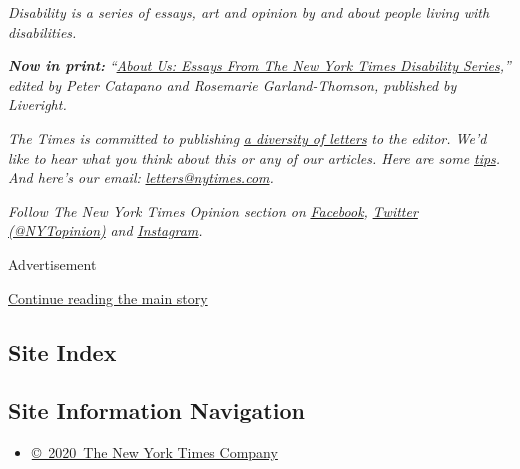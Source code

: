 \emph{Disability is a series of essays, art and opinion by and about
people living with disabilities.}

\emph{\textbf{Now in print:}}
\emph{``}\href{http://bit.ly/2WTWIVv}{\emph{About Us: Essays From The
New York Times Disability Series}}\emph{,'' edited by Peter Catapano and
Rosemarie Garland-Thomson, published by Liveright.}

\emph{The Times is committed to publishing}
\href{https://www.nytimes.com/2019/01/31/opinion/letters/letters-to-editor-new-york-times-women.html}{\emph{a
diversity of letters}} \emph{to the editor. We'd like to hear what you
think about this or any of our articles. Here are some}
\href{https://help.nytimes.com/hc/en-us/articles/115014925288-How-to-submit-a-letter-to-the-editor}{\emph{tips}}\emph{.
And here's our email:}
\href{mailto:letters@nytimes.com}{\emph{letters@nytimes.com}}\emph{.}

\emph{Follow The New York Times Opinion section on}
\href{https://www.facebook.com/nytopinion}{\emph{Facebook}}\emph{,}
\href{http://twitter.com/NYTOpinion}{\emph{Twitter (@NYTopinion)}}
\emph{and}
\href{https://www.instagram.com/nytopinion/}{\emph{Instagram}}\emph{.}

Advertisement

\protect\hyperlink{after-bottom}{Continue reading the main story}

\hypertarget{site-index}{%
\subsection{Site Index}\label{site-index}}

\hypertarget{site-information-navigation}{%
\subsection{Site Information
Navigation}\label{site-information-navigation}}

\begin{itemize}
\tightlist
\item
  \href{https://help.nytimes.com/hc/en-us/articles/115014792127-Copyright-notice}{©~2020~The
  New York Times Company}
\end{itemize}

